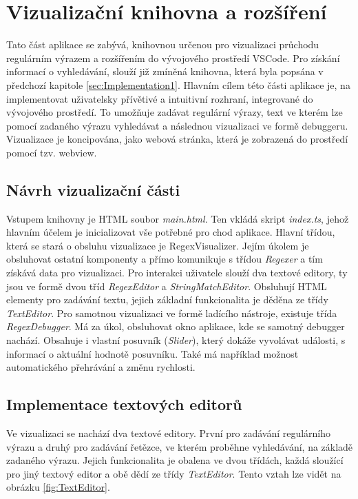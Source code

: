 \chapter{Vizualizační knihovna a rozšíření}\label{sec:Implementation2}

Tato část aplikace se zabývá, knihovnou určenou pro vizualizaci průchodu regulárním výrazem a rozšířením do vývojového prostředí VSCode.
Pro získání informací o vyhledávání, slouží již zmíněná knihovna, která byla popsána v předchozí kapitole \ref{sec:Implementation1}.
Hlavním cílem této části aplikace je, na implementovat uživatelsky přívětivé a intuitivní rozhraní, integrované do vývojového prostředí.
To umožňuje zadávat regulární výrazy, text ve kterém lze pomocí zadaného výrazu vyhledávat a následnou vizualizaci ve formě debuggeru.
Vizualizace je koncipována, jako webová stránka, která je zobrazená do prostředí pomocí tzv. webview.

\section{Návrh vizualizační části}

Vstupem knihovny je HTML soubor \textit{main.html}.
Ten vkládá skript \textit{index.ts}, jehož hlavním účelem je inicializovat vše potřebné pro chod aplikace.
Hlavní třídou, která se stará o obsluhu vizualizace je RegexVisualizer. 
Jejím úkolem je obsluhovat ostatní komponenty a přímo komunikuje s třídou \textit{Regexer} a tím získává data pro vizualizaci.
Pro interakci uživatele slouží dva textové editory, ty jsou ve formě dvou tříd \textit{RegexEditor} a \textit{StringMatchEditor}.
Obsluhují HTML elementy pro zadávání textu, jejich základní funkcionalita je děděna ze třídy \textit{TextEditor}.
Pro samotnou vizualizaci ve formě ladícího nástroje, existuje třída \textit{RegexDebugger}.
Má za úkol, obsluhovat okno aplikace, kde se samotný debugger nachází.
Obsahuje i vlastní posuvník (\textit{Slider}), který dokáže vyvolávat události, s informací o aktuální hodnotě posuvníku.
Také má například možnost automatického přehrávání a změnu rychlosti.


\section{Implementace textových editorů}

Ve vizualizaci se nachází dva textové editory.
První pro zadávání regulárního výrazu a druhý pro zadávání řetězce, ve kterém proběhne vyhledávání, na základě zadaného výrazu.
Jejich funkcionalita je obalena ve dvou třídách, každá sloužící pro jiný textový editor a obě dědí ze třídy \textit{TextEditor}.
Tento vztah lze vidět na obrázku \ref{fig:TextEditor}.

